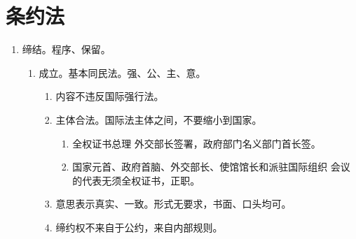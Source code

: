 \section{条约法}
\begin{enumerate}
  \item 缔结。程序、保留。
        \begin{enumerate}
          \item 成立。基本同民法。强、公、主、意。
                \begin{enumerate}
                  \item 内容不违反国际强行法。
                  \item 主体合法。国际法主体之间，不要缩小到国家。
                        \begin{enumerate}
                          \item 全权证书总理 \hz 外交部长签署，政府部门名义部门首长签。
                          \item 国家元首、政府首脑、外交部长、使馆馆长和派驻国际组织 \hz 会议的代表无须全权证书，正职。
                        \end{enumerate}
                  \item 意思表示真实、一致。形式无要求，书面、口头均可。
                  \item 缔约权不来自于公约，来自内部规则。
                \end{enumerate}


\end{enumerate}
\end{enumerate}
